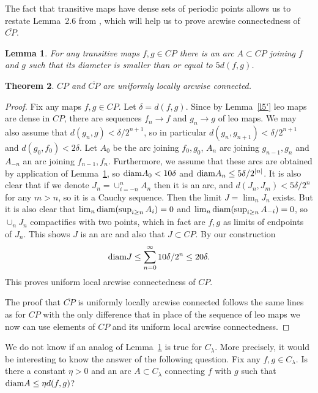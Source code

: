 \documentclass[12pt, a4paper]{amsart}
\newtheorem{theorem}{Theorem}[section]
\newtheorem{lemma}[theorem]{Lemma}
\def\diam{\mbox{\rm diam} }
\newcommand{\?}{{\bf ???}}
\def\CP{\overline{CP}}
\begin{document}
The fact that transitive maps have dense sets of periodic points allows us to restate Lemma~2.6 from \cite{KMS}, which will help us to prove arcwise connectedness of $\CP$.
\begin{lemma}\label{lem:ulac}
For any transitive maps $f, g\in CP$ there is an arc $A\subset CP$ joining $f$ and $g$ such that its diameter is smaller than or
equal to $5d(f,g)$.
\end{lemma}


\begin{theorem}\label{thm1}
$CP$ and $\overline{CP}$ are uniformly locally arcwise connected.
\end{theorem}

\begin{proof}
Fix any maps $f,g\in CP$. 
Let $\delta=d(f,g)$.
Since by Lemma~\ref{l5'} leo maps are dense in $CP$, there are sequences $f_n\to f$ and $g_n\to g$ of leo maps.
We may also assume that $d(g_n,g)<\delta/2^{n+1}$, so in particular $d(g_n,g_{n+1})<\delta/2^{n+1}$ and $d(g_0,f_0)<2\delta$.
Let $A_0$ be the arc joining $f_0,g_0$,
$A_n$ arc joining $g_{n-1},g_n$ and $A_{-n}$ an arc joining $f_{n-1},f_n$.
Furthermore, we assume that these arcs are obtained by application of Lemma~\ref{lem:ulac}, so $\diam A_0<10\delta$ and $\diam A_n\leq 5\delta/2^{|n|}$. It is also clear that if we denote $J_n=\cup_{i=-n}^n A_n$ then it is an arc, and $d(J_n,J_m)<5\delta/2^n$ for any $m>n$, so it is a Cauchy sequence.
Then the limit $J=\lim_n J_n$ exists. But it is also clear that $\lim_n \diam (\sup_{i\geq n}A_i)=0$ and $\lim_n \diam (\sup_{i\geq n}A_{-i})=0$, so $\cup_n J_n$ compactifies with two points, which in fact are $f,g$ as limits of endpoints of $J_n$. This shows $J$ is an arc and also that $J\subset CP$. By our construction
$$
\diam J\leq \sum_{n=0}^\infty 10\delta /2^{n}\leq 20\delta.
$$
This proves uniform local arcwise connectedness of $CP$.

The proof that $\overline{CP}$ is uniformly locally arcwise connected follows the same lines as for $CP$ with the only difference that in place of the sequence of leo maps we now can use elements of $CP$
 and its uniform local arcwise connectedness.
 \end{proof}

We do not know if an analog of Lemma~\ref{lem:ulac} is true for $C_\lambda$. More precisely, it would be interesting to know the answer of the following question.
Fix any $f, g\in C_\lambda$. Is there a constant $\eta>0$ and an arc $A\subset C_\lambda$ connecting $f$ with $g$ 
such that $\diam A\leq \eta d(f,g)$?
\end{document}
